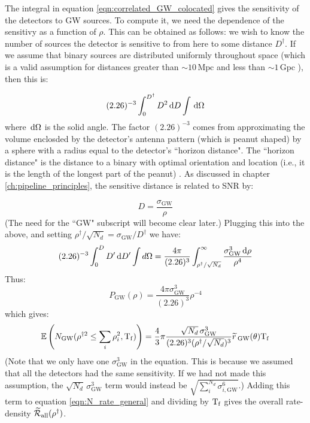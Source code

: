 The integral in equation \ref{eqn:correlated_GW_colocated} gives the sensitivity of the detectors to \ac{GW} sources. To compute it, we need the dependence of the sensitivy as a function of $\rho$. This can be obtained as follows: we wish to know the number of sources the detector is sensitive to from here to some distance $D^\dagger$. If we assume that binary sources are distributed uniformly throughout space (which is a valid assumption for distances greater than $\sim10\,\mathrm{Mpc}$ and less than $\sim1\,\mathrm{Gpc}$ \cite{rates doc}), then this is:

\begin{equation}
(2.26)^{-3} \int_{0}^{D^\dagger} D^2 \,\mathrm{d} D \int \,\mathrm{d}\Omega
\end{equation}
where $\,\mathrm{d}\Omega$ is the solid angle. The factor $(2.26)^{-3}$ comes from approximating the volume enclosded by the detector's antenna pattern (which is peanut shaped) by a sphere with a radius equal to the detector's ``horizon distance". The ``horizon distance" is the distance to a binary with optimal orientation and location (i.e., it is the length of the longest part of the peanut) \cite{Finn and Chernoff}. As discussed in chapter \ref{ch:pipeline_principles}, the sensitive distance is related to \ac{SNR} by:

\begin{equation}
\label{eqn:DtoRho}
D = \frac{\sigma_{\mathrm{GW}}}{\rho}
\end{equation}
(The need for the ``$\mathrm{GW}$" subscript will become clear later.) Plugging this into the above, and setting $\rho^\dagger / \sqrt{N_d} = \sigma_{\mathrm{GW}} / D^\dagger$ we have:
\begin{equation}
(2.26)^{-3} \int_{0}^{D} D' \,\mathrm{d} D' \int d\Omega = \frac{4\pi}{(2.26)^3} \int_{\rho^\dagger/\sqrt{N_d}}^{\infty} \frac{\sigma_{\mathrm{GW}}^3 \,\mathrm{d}\rho}{\rho^4}
\end{equation}
Thus:
\begin{equation}
\label{eqn:GW_pdf}
P_{\mathrm{GW}}(\rho) = \frac{4\pi \sigma_{\mathrm{GW}}^3}{(2.26)^3} \rho^{-4}
\end{equation}
which gives:
\begin{equation}
\label{eqn:expectedN_GW}
\mathbb{E}\left(N_{\mathrm{GW}} (\rho^{\dagger2} \leq  \sum_i\rho_i^2, \mathrm{T_f} ) \right) = \frac{4}{3} \pi \frac{\sqrt{N_d}\, \sigma_{\mathrm{GW}}^3}{(2.26)^3 (\rho^\dagger/\sqrt{N_d})^3} \widetilde{r}\,_{\mathrm{GW}}(\theta) \mathrm{T_f} 
\end{equation}
(Note that we only have one $\sigma_{\mathrm{GW}}^3$ in the equation. This is because we assumed that all the detectors had the same sensitivity. If we had not made this assumption, the $\sqrt{N_d}\,\sigma_{\mathrm{GW}}^3$ term would instead be $\sqrt{ \sum_i^{N_d} \sigma_{i,\mathrm{GW}}^6 }$.) Adding this term to equation \ref{eqn:N_rate_general} and dividing by $\mathrm{T_f}$ gives the overall rate-density $\widetilde{\mathcal{R}}_{\mathrm{all}}(\rho^\dagger)$.

